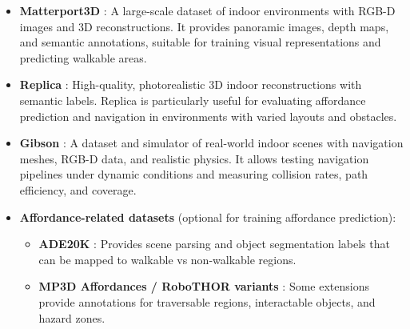 \documentclass{article}
\begin{document}
\begin{itemize}
    \item \textbf{Matterport3D} \cite{yadav2023habitat}: A large-scale dataset of indoor environments with RGB-D images and 3D reconstructions. It provides panoramic images, depth maps, and semantic annotations, suitable for training visual representations and predicting walkable areas.

    \item \textbf{Replica} \cite{straub2019replicadatasetdigitalreplica}: High-quality, photorealistic 3D indoor reconstructions with semantic labels. Replica is particularly useful for evaluating affordance prediction and navigation in environments with varied layouts and obstacles.

    \item \textbf{Gibson} \cite{yokoyama2022benchmarking}: A dataset and simulator of real-world indoor scenes with navigation meshes, RGB-D data, and realistic physics. It allows testing navigation pipelines under dynamic conditions and measuring collision rates, path efficiency, and coverage.


    \item \textbf{Affordance-related datasets} (optional for training affordance prediction):
    \begin{itemize}
        \item \textbf{ADE20K} \cite{zhou2017ade20k}: Provides scene parsing and object segmentation labels that can be mapped to walkable vs non-walkable regions.  
        \item \textbf{MP3D Affordances / RoboTHOR variants} \cite{deitke2020robothor}: Some extensions provide annotations for traversable regions, interactable objects, and hazard zones.
    \end{itemize}
\end{itemize}
\end{document}
